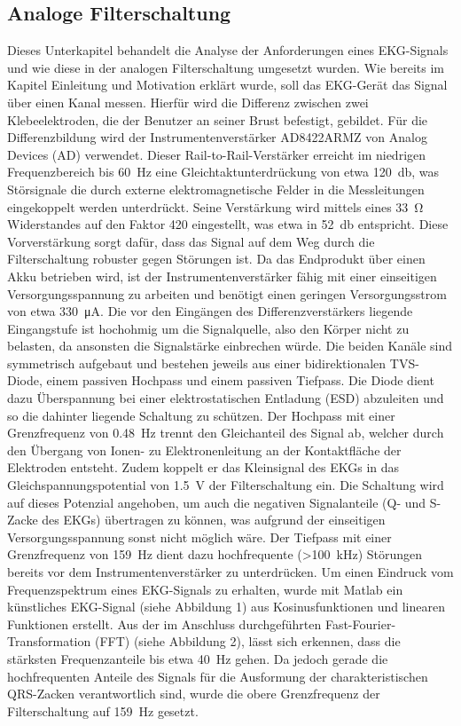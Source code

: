 
\subsection{Analoge Filterschaltung}

Dieses Unterkapitel behandelt die Analyse der Anforderungen eines EKG-Signals und wie diese in der analogen Filterschaltung umgesetzt wurden. Wie bereits im Kapitel Einleitung und Motivation erklärt wurde, soll das EKG-Gerät das Signal über einen Kanal messen. Hierfür wird die Differenz zwischen zwei Klebeelektroden, die der Benutzer an seiner Brust befestigt, gebildet. Für die Differenzbildung wird der Instrumentenverstärker AD8422ARMZ von Analog Devices (AD) verwendet. Dieser Rail-to-Rail-Verstärker erreicht im niedrigen Frequenzbereich bis \SI{60}{\hertz} eine Gleichtaktunterdrückung von etwa \SI{120}{\decibel}, was Störsignale die durch externe elektromagnetische Felder in die Messleitungen eingekoppelt werden unterdrückt. Seine Verstärkung wird mittels eines \SI{33}{\ohm} Widerstandes auf den Faktor 420 eingestellt, was etwa in \SI{52}{\decibel} entspricht. Diese Vorverstärkung sorgt dafür, dass das Signal auf dem Weg durch die Filterschaltung robuster gegen Störungen ist. Da das Endprodukt über einen Akku betrieben wird, ist der Instrumentenverstärker fähig mit einer einseitigen Versorgungsspannung zu arbeiten und benötigt einen geringen Versorgungsstrom von etwa \SI{330}{\micro\ampere}. Die vor den Eingängen des Differenzverstärkers liegende Eingangstufe ist hochohmig um die Signalquelle, also den Körper nicht zu belasten, da ansonsten die Signalstärke einbrechen würde. Die beiden Kanäle sind symmetrisch aufgebaut und bestehen jeweils aus einer bidirektionalen TVS-Diode, einem passiven Hochpass und einem passiven Tiefpass. Die Diode dient dazu Überspannung bei einer elektrostatischen Entladung (ESD) abzuleiten und so die dahinter liegende Schaltung zu schützen. Der Hochpass mit einer Grenzfrequenz von \SI{0,48}{\hertz} trennt den Gleichanteil des Signal ab, welcher durch den Übergang von Ionen- zu Elektronenleitung an der Kontaktfläche der Elektroden entsteht. Zudem koppelt er das Kleinsignal des EKGs in das Gleichspannungspotential von \SI{1,5}{\volt} der Filterschaltung ein. Die Schaltung wird auf dieses Potenzial angehoben, um auch die negativen Signalanteile (Q- und S-Zacke des EKGs) übertragen zu können, was aufgrund der einseitigen Versorgungsspannung sonst nicht möglich wäre. Der Tiefpass mit einer Grenzfrequenz von \SI{159}{\hertz} dient dazu hochfrequente (>\SI{100}{\kilo\hertz}) Störungen bereits vor dem Instrumentenverstärker zu unterdrücken. Um einen Eindruck vom Frequenzspektrum eines EKG-Signals zu erhalten, wurde mit Matlab ein künstliches EKG-Signal (siehe Abbildung 1) aus Kosinusfunktionen und linearen Funktionen erstellt. Aus der im Anschluss durchgeführten Fast-Fourier-Transformation (FFT) (siehe Abbildung 2), lässt sich erkennen, dass die stärksten Frequenzanteile bis etwa \SI{40}{\hertz} gehen. Da jedoch gerade die hochfrequenten Anteile des Signals für die Ausformung der charakteristischen QRS-Zacken verantwortlich sind, wurde die obere Grenzfrequenz der Filterschaltung auf \SI{159}{\hertz} gesetzt. 

